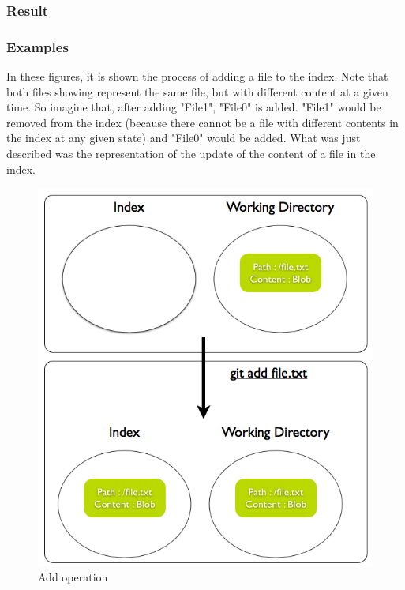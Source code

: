 \subsubsection{Result}

\subsubsection{Examples}

In these figures, it is shown the process of adding a file to the index. Note
that both files showing represent the same file, but with different content at
a given time. So imagine that, after adding "File1", "File0" is added. "File1"
would be removed from the index (because there cannot be a file with different
contents in the index at any given state) and "File0" would be added. What was
just described was the representation of the update of the content of a file in the
index. \par
\begin{figure}[h] 
	\caption{Add operation}
	\centering
	\includegraphics[scale=0.40]{images/add1.png}
\end{figure}

